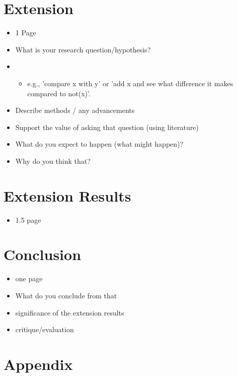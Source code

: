 \documentclass[twocolumn,a4paper]{article}
\begin{document}
    \section{Extension}
    \begin{itemize}
        \item 1 Page
        \item What is your research question/hypothesis?
        \item \begin{itemize}
            \item e.g., 'compare x with y' or 'add x and see what difference it makes compared to not(x)'.
        \end{itemize}
        \item Describe methods / any advancements
        \item Support the value of asking that question (using literature)
        \item What do you expect to happen (what might happen)?
        \item Why do you think that?
    \end{itemize}


    \section{Extension Results}
    \begin{itemize}
        \item 1.5 page
    \end{itemize}


    \section{Conclusion}
    \begin{itemize}
        \item one page
        \item What do you conclude from that
        \item significance of the extension results
        \item critique/evaluation
    \end{itemize}


    \section{Appendix}
\end{document}
